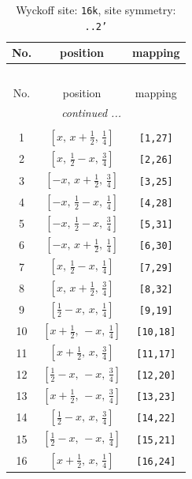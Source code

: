 \documentclass[fleqn,8pt]{jsarticle}
\begin{document}
\begin{longtable}{ccc}
\caption{Wyckoff site: {\tt 16k}, site symmetry: {\tt ..2'}}
 \\
 \hline \hline
No. & position & mapping \\ \hline \endfirsthead

\multicolumn{2}{l}{\tablename\ \thetable{}} \\
 \hline \hline
No. & position & mapping \\ \hline \endhead

 \hline \hline
\multicolumn{2}{r}{\footnotesize\it continued ...} \\ \endfoot

 \hline \hline
\multicolumn{2}{r}{} \\ \endlastfoot

1 & $\left[ x,\, x + \frac{1}{2},\, \frac{1}{4} \right]$ & {\tt [1,27]} \\ \hline
2 & $\left[ x,\, \frac{1}{2} - x,\, \frac{3}{4} \right]$ & {\tt [2,26]} \\ \hline
3 & $\left[ - x,\, x + \frac{1}{2},\, \frac{3}{4} \right]$ & {\tt [3,25]} \\ \hline
4 & $\left[ - x,\, \frac{1}{2} - x,\, \frac{1}{4} \right]$ & {\tt [4,28]} \\ \hline
5 & $\left[ - x,\, \frac{1}{2} - x,\, \frac{3}{4} \right]$ & {\tt [5,31]} \\ \hline
6 & $\left[ - x,\, x + \frac{1}{2},\, \frac{1}{4} \right]$ & {\tt [6,30]} \\ \hline
7 & $\left[ x,\, \frac{1}{2} - x,\, \frac{1}{4} \right]$ & {\tt [7,29]} \\ \hline
8 & $\left[ x,\, x + \frac{1}{2},\, \frac{3}{4} \right]$ & {\tt [8,32]} \\ \hline
9 & $\left[ \frac{1}{2} - x,\, x,\, \frac{1}{4} \right]$ & {\tt [9,19]} \\ \hline
10 & $\left[ x + \frac{1}{2},\, - x,\, \frac{1}{4} \right]$ & {\tt [10,18]} \\ \hline
11 & $\left[ x + \frac{1}{2},\, x,\, \frac{3}{4} \right]$ & {\tt [11,17]} \\ \hline
12 & $\left[ \frac{1}{2} - x,\, - x,\, \frac{3}{4} \right]$ & {\tt [12,20]} \\ \hline
13 & $\left[ x + \frac{1}{2},\, - x,\, \frac{3}{4} \right]$ & {\tt [13,23]} \\ \hline
14 & $\left[ \frac{1}{2} - x,\, x,\, \frac{3}{4} \right]$ & {\tt [14,22]} \\ \hline
15 & $\left[ \frac{1}{2} - x,\, - x,\, \frac{1}{4} \right]$ & {\tt [15,21]} \\ \hline
16 & $\left[ x + \frac{1}{2},\, x,\, \frac{1}{4} \right]$ & {\tt [16,24]} \\
\end{longtable}
\end{document}
